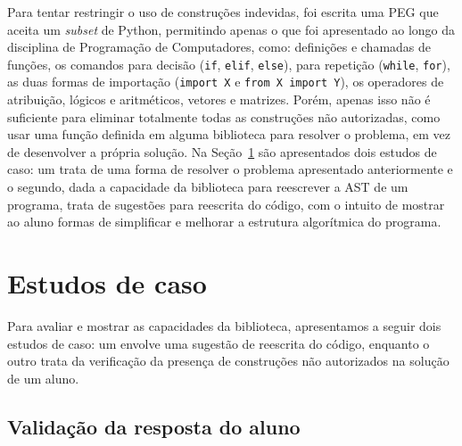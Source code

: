 \documentclass[12pt]{article}
\begin{document}



Para tentar restringir o uso de construções indevidas, foi escrita uma PEG que
aceita um \textit{subset} de Python, permitindo apenas o que foi apresentado ao
longo da disciplina de Programação de Computadores, como: definições e chamadas 
de funções, os comandos para decisão (\texttt{if}, \texttt{elif}, \texttt{else}), 
para repetição (\texttt{while}, \texttt{for}), as duas formas de importação
(\texttt{import X} e \texttt{from X import Y}), os operadores de atribuição,
lógicos e aritméticos, vetores e matrizes.
Porém, apenas isso não é suficiente para eliminar totalmente todas as construções
não autorizadas, como usar uma função definida em alguma biblioteca para resolver
o problema, em vez de desenvolver a própria solução. Na Seção~\ref{sec:estudos-caso}
são apresentados dois estudos de caso: um trata de uma forma de resolver o problema 
apresentado anteriormente e o segundo, dada a capacidade da biblioteca para 
reescrever a AST de um programa, trata de sugestões para reescrita do código, 
com o intuito de mostrar ao aluno formas de simplificar e melhorar a estrutura 
algorítmica do programa.


\section{Estudos de caso} \label{sec:estudos-caso}

Para avaliar e mostrar as capacidades da biblioteca, apresentamos a seguir dois
estudos de caso: um envolve uma sugestão de reescrita do código, enquanto o outro 
trata da verificação da presença de construções não autorizados na solução de um 
aluno.

\subsection{Validação da resposta do aluno}
\end{document}
